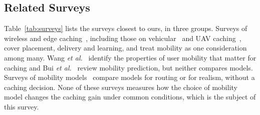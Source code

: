 \subsection{Related Surveys}
\label{subsec:related}

Table~\ref{tab:surveys} lists the surveys closest to ours, in three groups. Surveys of wireless and edge caching~\cite{bastug2014living,wang2017survey,li2018survey,paschos2018role,yao2019mobile,shuja2021applying}, including those on vehicular~\cite{dziyauddin2021computation} and UAV caching~\cite{duong2022uav}, cover placement, delivery and learning, and treat mobility as one consideration among many. Wang \emph{et al.}~\cite{wang2016framework} identify the properties of user mobility that matter for caching and Bui \emph{et al.}~\cite{bui2017survey} review mobility prediction, but neither compares models. Surveys of mobility models~\cite{camp2002survey,hess2016datadriven,solmaz2019survey,waqas2020survey} compare models for routing or for realism, without a caching decision. None of these surveys measures how the choice of mobility model changes the caching gain under common conditions, which is the subject of this survey.

